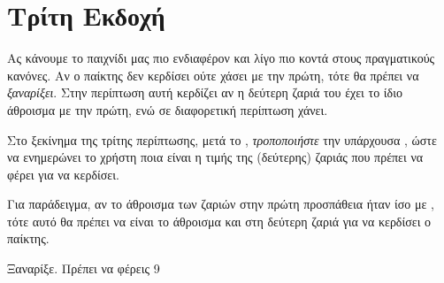 \documentclass[a4paper,11pt,oneside]{book}
\begin{document}
\begin{step}









\end{step}

\section{Τρίτη Εκδοχή}

Ας κάνουμε το παιχνίδι μας πιο ενδιαφέρον και λίγο πιο κοντά στους πραγματικούς κανόνες. Αν ο παίκτης δεν κερδίσει ούτε χάσει με την πρώτη, τότε θα πρέπει να \emph{ξαναρίξει}. Στην περίπτωση αυτή κερδίζει αν η δεύτερη ζαριά του έχει το ίδιο άθροισμα με την πρώτη, ενώ σε διαφορετική περίπτωση χάνει.

\begin{step}
Στο ξεκίνημα της τρίτης περίπτωσης, μετά το , \emph{τροποποιήστε} την υπάρχουσα , ώστε να ενημερώνει το χρήστη ποια είναι η τιμής της (δεύτερης) ζαριάς που πρέπει να φέρει για να κερδίσει. 

Για παράδειγμα, αν το άθροισμα των ζαριών στην πρώτη προσπάθεια ήταν ίσο με , τότε αυτό θα πρέπει να είναι το άθροισμα και στη δεύτερη ζαριά για να κερδίσει ο παίκτης.

\marginnote[16pt]{\iconcomputer}
\begin{pyterm}
Ξαναρίξε. Πρέπει να φέρεις 9
\end{pyterm}
\end{step}
\end{document}
